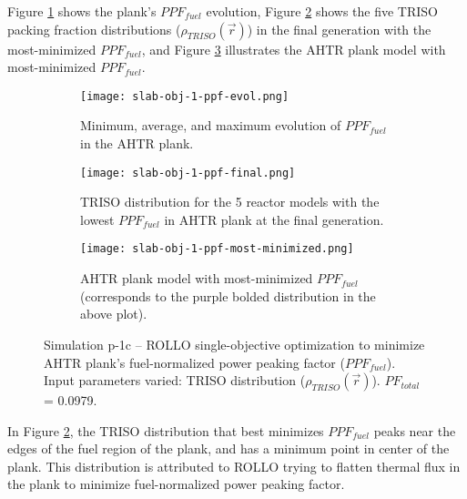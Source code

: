 Figure \ref{fig:slab-obj-1-ppf-evol} shows the plank's $PPF_{fuel}$ evolution, 
Figure \ref{fig:slab-obj-1-ppf-final} shows the five \gls{TRISO} 
packing fraction distributions ($\rho_{TRISO}(\vec{r})$) in the final generation 
with the most-minimized $PPF_{fuel}$, and Figure 
\ref{fig:slab-obj-1-ppf-most-minimized} illustrates the \gls{AHTR} plank model with 
most-minimized $PPF_{fuel}$. 
\begin{figure}[H]
    \centering
    \begin{subfigure}{0.9\textwidth}
        \texttt{[image: slab-obj-1-ppf-evol.png]}
        \caption{Minimum, average, and maximum evolution of $PPF_{fuel}$ in the 
        AHTR plank.}
        \label{fig:slab-obj-1-ppf-evol} 
    \end{subfigure}
    \begin{subfigure}{0.9\textwidth}
        \texttt{[image: slab-obj-1-ppf-final.png]}
        \caption{TRISO distribution for the 5 reactor models with the 
        lowest $PPF_{fuel}$ in AHTR plank at the final generation.}
        \label{fig:slab-obj-1-ppf-final} 
    \end{subfigure}
    \begin{subfigure}{0.9\textwidth}
        \texttt{[image: slab-obj-1-ppf-most-minimized.png]}
        \caption{\gls{AHTR} plank model with most-minimized $PPF_{fuel}$
        (corresponds to the purple bolded distribution in the above plot).}
        \label{fig:slab-obj-1-ppf-most-minimized} 
    \end{subfigure}
    \caption{Simulation p-1c -- ROLLO single-objective optimization to minimize 
    AHTR plank's fuel-normalized power peaking factor ($PPF_{fuel}$). 
    Input parameters varied: TRISO distribution ($\rho_{TRISO}(\vec{r})$).
    $PF_{total}$ = 0.0979.}
    \label{fig:slab-obj-1-ppf}
\end{figure}

In Figure \ref{fig:slab-obj-1-ppf-final}, the TRISO distribution that best minimizes 
$PPF_{fuel}$ peaks near the edges of the fuel region of the plank, and has a minimum 
point in center of the plank.
This distribution is attributed to \gls{ROLLO} trying to flatten thermal flux in 
the plank to minimize fuel-normalized power peaking factor. 

